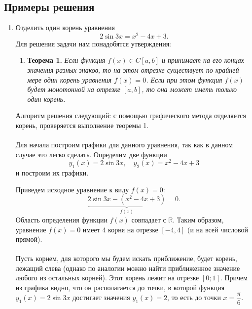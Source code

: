 \documentclass[a4paper, 12pt]{report}
\newcommand{\Rm}{\mathbb{R}}
\begin{document}
	\subsection{Примеры решения}
	\begin{enumerate}
		\item Отделить один корень уравнения $$2\sin3x = x^2 - 4x + 3.$$
		Для решения задачи нам понадобятся утверждения:
		\begin{enumerate}
			\item \textbf{Теорема 1.} \textit{Если функция $f(x)\in C[a,b]$ и принимает на его концах значения разных знаков, то на этом отрезке существует по крайней мере один корень уравнения $f(x) = 0$.
			Если при этом функция $f(x)$ будет монотонной на отрезке $[a,b]$, то она может иметь только один корень.}
		\end{enumerate}
		Алгоритм решения следующий: с помощью графического метода отделяется корень, проверяется выполнение теоремы 1.\\\\
		Для начала построим графики для данного уравнения, так как в данном случае это легко сделать. Определим две функции $$y_1(x) = 2\sin 3x,\quad y_2(x) = x^2 - 4x+3$$ и построим их графики.
		\begin{center}\end{center}
		Приведем исходное уравнение к виду $f(x) = 0$: $$\underbrace{2\sin 3x - (x^2 - 4x+3)}_{f(x)} = 0.$$
		Область определения функции $f(x)$ совпадает с $\Rm$.
		Таким образом, уравнение $f(x)=0$ имеет 4 корня на отрезке $[-4,4]$ (и на всей числовой прямой). \\\\
		Пусть корнем, для которого мы будем искать приближение, будет корень, лежащий слева (однако по аналогии можно найти приближенное значение любого из остальных корней). Этот корень лежит на отрезке $[0; 1]$. Причем из графика видно, что он располагается до точки, в которой функция $y_1(x) = 2\sin3x$ достигает значения $y_1(x) = 2$, то есть до точки $x = \dfrac\pi6$.

\end{enumerate}
\end{document}
